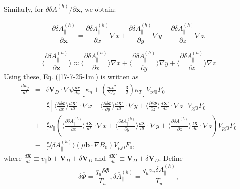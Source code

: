\documentclass{llncs}
\begin{document}
Similarly, for $\partial \delta A_{\parallel}^{(h)} / \partial \mathbf{x}$, we
obtain:


\begin{equation}
  \frac{\partial \delta A_{\parallel}^{(h)}}{\partial \mathbf{x}} =
  \frac{\partial \delta A_{\parallel}^{(h)}}{\partial x} \nabla x +
  \frac{\partial \delta A_{\parallel}^{(h)}}{\partial y} \nabla y +
  \frac{\partial \delta A_{\parallel}^{(h)}}{\partial z} \nabla z.
\end{equation}

\begin{equation}
  \langle \frac{\partial \delta A_{\parallel}^{(h)}}{\partial \mathbf{x}}
  \rangle \approx \langle \frac{\partial \delta A_{\parallel}^{(h)}}{\partial
  x} \rangle \nabla x + \langle \frac{\partial \delta
  A_{\parallel}^{(h)}}{\partial y} \rangle \nabla y + \langle \frac{\partial
  \delta A_{\parallel}^{(h)}}{\partial z} \rangle \nabla z
\end{equation}
Using these, Eq. (\ref{17-7-25-1m}) is written as
\begin{eqnarray}
  \frac{d w_j}{d t} & = & \delta \mathbf{V}_D \cdot \nabla \psi \frac{d r}{d
  \psi} \left[ \kappa_n + \left( \frac{m v^2}{2 T_0} - \frac{3}{2} \right)
  \kappa_T \right] V_{p j 0} F_0 \nonumber\\
  & - & \frac{q}{T} \left[ \langle \frac{\partial \delta \Phi}{\partial x}
  \rangle \frac{d\mathbf{X}'}{d t} \cdot \nabla x + \langle \frac{\partial
  \delta \Phi}{\partial y} \rangle \frac{d\mathbf{X}'}{d t} \cdot \nabla y +
  \langle \frac{\partial \delta \Phi}{\partial z} \rangle
  \frac{d\mathbf{X}'}{d t} \cdot \nabla z \right] V_{p j 0} F_0 \nonumber\\
  & + & \frac{q}{T} v_{\parallel} \left( \langle \frac{\partial \delta
  A_{\parallel}^{(h)}}{\partial x} \rangle \frac{d\mathbf{X}}{d t} \cdot
  \nabla x + \langle \frac{\partial \delta A_{\parallel}^{(h)}}{\partial y}
  \rangle \frac{d\mathbf{X}}{d t} \cdot \nabla y + \langle \frac{\partial
  \delta A_{\parallel}^{(h)}}{\partial z} \rangle \frac{d\mathbf{X}}{d t}
  \cdot \nabla z \right) V_{p j 0} F_0 \nonumber\\
  & - & \frac{q}{T} \langle \delta A_{\parallel}^{(h)} \rangle (\mu
  \mathbf{b} \cdot \nabla B_0) V_{p j 0} F_0, 
\end{eqnarray}
where $\frac{d\mathbf{X}}{d t} \equiv v_{\parallel} \mathbf{b}+ \mathbf{V}_D +
\delta \mathbf{V}_D$ and $\frac{d\mathbf{X}'}{d t} \equiv \mathbf{V}_D +
\delta \mathbf{V}_D$. Define
\begin{equation}
  \delta \overline{\Phi} = \frac{q_u \delta \Phi}{T_u}, \delta
  \overline{A}_{\parallel}^{(h)} = \frac{q_u v_u \delta
  A_{\parallel}^{(h)}}{T_u},
\end{equation}
\end{document}
